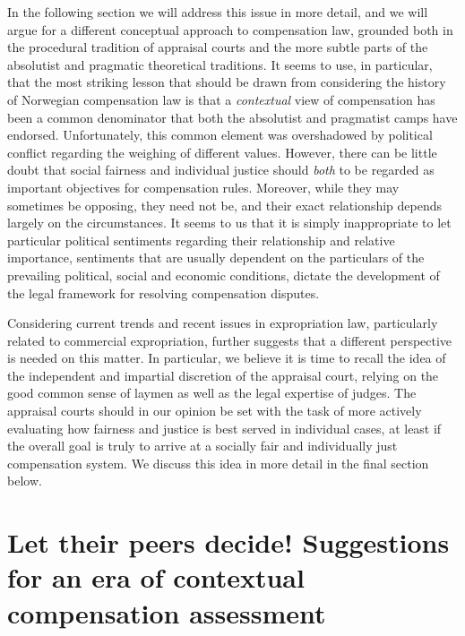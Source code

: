 \documentclass[10pt]{article} %
\begin{document}
In the following section we will address this issue in more detail, and we will argue for a different conceptual approach to compensation law, grounded both in the procedural tradition of appraisal courts and the more subtle parts of the absolutist and pragmatic theoretical traditions. It seems to use, in particular, that the most striking lesson that should be drawn from considering the history of Norwegian compensation law is that a \emph{contextual} view of compensation has been a common denominator that both the absolutist and pragmatist camps have endorsed. Unfortunately, this common element was overshadowed by political conflict regarding the weighing of different values. However, there can be little doubt that social fairness and individual justice should \emph{both} to be regarded as important objectives for compensation rules. Moreover, while they may sometimes be opposing, they need not be, and their exact relationship depends largely on the circumstances. It seems to us that it is simply inappropriate to let particular political sentiments regarding their relationship and relative importance, sentiments that are usually dependent on the particulars of the prevailing political, social and economic conditions, dictate the development of the legal framework for resolving compensation disputes.

Considering current trends and recent issues in expropriation law, particularly related to commercial expropriation, further suggests that a different perspective is needed on this matter. In particular, we believe it is time to recall the idea of the independent and impartial discretion of the appraisal court, relying on the good common sense of laymen as well as the legal expertise of judges. The appraisal courts should in our opinion be set with the task of more actively evaluating how fairness and justice is best served in individual cases, at least if the overall goal is truly to arrive at a socially fair and individually just compensation system. We discuss this idea in more detail in the final section below.

\section{Let their peers decide! Suggestions for an era of contextual compensation assessment}\label{sec:context}
\end{document}
